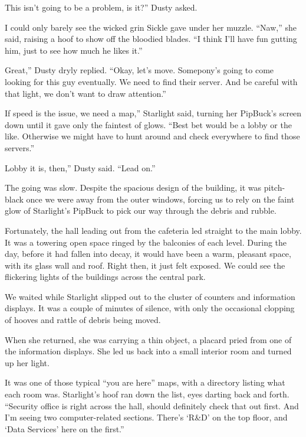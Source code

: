 \leavevmode{}This isn’t going to be a problem, is it?” Dusty asked.

I could only barely see the wicked grin Sickle gave under her muzzle. “Naw,” she said, raising a hoof to show off the bloodied blades. “I think I’ll have fun gutting him, just to see how much he likes it.”

\leavevmode{}Great,” Dusty dryly replied. “Okay, let’s move. Somepony’s going to come looking for this guy eventually. We need to find their server. And be careful with that light, we don’t want to draw attention.”

\leavevmode{}If speed is the issue, we need a map,” Starlight said, turning her PipBuck’s screen down until it gave only the faintest of glows. “Best bet would be a lobby or the like. Otherwise we might have to hunt around and check everywhere to find those servers.”

\leavevmode{}Lobby it is, then,” Dusty said. “Lead on.”

The going was slow. Despite the spacious design of the building, it was pitch-black once we were away from the outer windows, forcing us to rely on the faint glow of Starlight’s PipBuck to pick our way through the debris and rubble.

Fortunately, the hall leading out from the cafeteria led straight to the main lobby. It was a towering open space ringed by the balconies of each level. During the day, before it had fallen into decay, it would have been a warm, pleasant space, with its glass wall and roof. Right then, it just felt exposed. We could see the flickering lights of the buildings across the central park.

We waited while Starlight slipped out to the cluster of counters and information displays. It was a couple of minutes of silence, with only the occasional clopping of hooves and rattle of debris being moved.

When she returned, she was carrying a thin object, a placard pried from one of the information displays. She led us back into a small interior room and turned up her light.

It was one of those typical “you are here” maps, with a directory listing what each room was. Starlight’s hoof ran down the list, eyes darting back and forth. “Security office is right across the hall, should definitely check that out first. And I’m seeing two computer-related sections. There’s ‘R\&D’ on the top floor, and ‘Data Services’ here on the first.”

